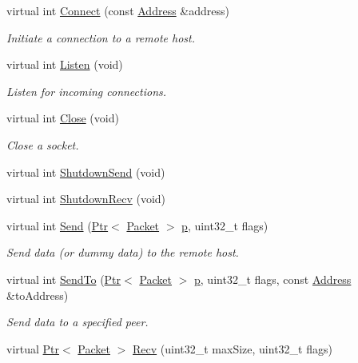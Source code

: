 \begin{DoxyCompactItemize}
virtual int \hyperlink{classns3_1_1TcpSocketBase_aabd08c9eb0ee3c88c855eb7268e392bf}{Connect} (const \hyperlink{classns3_1_1Address}{Address} \&address)
\begin{DoxyCompactList}\small\item\em Initiate a connection to a remote host. \end{DoxyCompactList}\item 
virtual int \hyperlink{classns3_1_1TcpSocketBase_a4d6c4cf0d65fd6e50aa969964ccc029b}{Listen} (void)
\begin{DoxyCompactList}\small\item\em Listen for incoming connections. \end{DoxyCompactList}\item 
virtual int \hyperlink{classns3_1_1TcpSocketBase_adab0076d02811c29ea9ced8b10e7a878}{Close} (void)
\begin{DoxyCompactList}\small\item\em Close a socket. \end{DoxyCompactList}\item 
virtual int \hyperlink{classns3_1_1TcpSocketBase_ab972c5b46c62fed0c30b387e03753ca7}{Shutdown\+Send} (void)
\item 
virtual int \hyperlink{classns3_1_1TcpSocketBase_a76be46f62b71156137ec760524aa47fa}{Shutdown\+Recv} (void)
\item 
virtual int \hyperlink{classns3_1_1TcpSocketBase_a172e373bab86078af4462fc1415c59e4}{Send} (\hyperlink{classns3_1_1Ptr}{Ptr}$<$ \hyperlink{classns3_1_1Packet}{Packet} $>$ \hyperlink{lte__link__budget__x2__handover__measures_8m_ac9de518908a968428863f829398a4e62}{p}, uint32\+\_\+t flags)
\begin{DoxyCompactList}\small\item\em Send data (or dummy data) to the remote host. \end{DoxyCompactList}\item 
virtual int \hyperlink{classns3_1_1TcpSocketBase_ac7bd6956cd3d723c454814698bc8f094}{Send\+To} (\hyperlink{classns3_1_1Ptr}{Ptr}$<$ \hyperlink{classns3_1_1Packet}{Packet} $>$ \hyperlink{lte__link__budget__x2__handover__measures_8m_ac9de518908a968428863f829398a4e62}{p}, uint32\+\_\+t flags, const \hyperlink{classns3_1_1Address}{Address} \&to\+Address)
\begin{DoxyCompactList}\small\item\em Send data to a specified peer. \end{DoxyCompactList}\item 
virtual \hyperlink{classns3_1_1Ptr}{Ptr}$<$ \hyperlink{classns3_1_1Packet}{Packet} $>$ \hyperlink{classns3_1_1TcpSocketBase_a114fc3153ceac81813f31651a4f9df9a}{Recv} (uint32\+\_\+t max\+Size, uint32\+\_\+t flags)

\end{DoxyCompactItemize}
